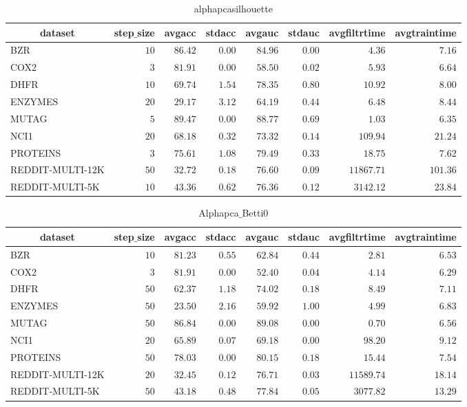 \documentclass[]{article}
\begin{document}
\begin{table}[!tbp]
\caption{alphapcasilhouette\label{alphapcasilhouette}} 
{\centering
\begin{tabular}{lrrrrrrr}
\hline\hline
\multicolumn{1}{c}{dataset}&\multicolumn{1}{c}{step$\_$size}&\multicolumn{1}{c}{avgacc}&\multicolumn{1}{c}{stdacc}&\multicolumn{1}{c}{avgauc}&\multicolumn{1}{c}{stdauc}&\multicolumn{1}{c}{avgfiltrtime}&\multicolumn{1}{c}{avgtraintime}\tabularnewline
\hline
BZR&$10$&$86.42$&$0.00$&$84.96$&$0.00$&$    4.36$&$  7.16$\tabularnewline
COX2&$ 3$&$81.91$&$0.00$&$58.50$&$0.02$&$    5.93$&$  6.64$\tabularnewline
DHFR&$10$&$69.74$&$1.54$&$78.35$&$0.80$&$   10.92$&$  8.00$\tabularnewline
ENZYMES&$20$&$29.17$&$3.12$&$64.19$&$0.44$&$    6.48$&$  8.44$\tabularnewline
MUTAG&$ 5$&$89.47$&$0.00$&$88.77$&$0.69$&$    1.03$&$  6.35$\tabularnewline
NCI1&$20$&$68.18$&$0.32$&$73.32$&$0.14$&$  109.94$&$ 21.24$\tabularnewline
PROTEINS&$ 3$&$75.61$&$1.08$&$79.49$&$0.33$&$   18.75$&$  7.62$\tabularnewline
REDDIT-MULTI-12K&$50$&$32.72$&$0.18$&$76.60$&$0.09$&$11867.71$&$101.36$\tabularnewline
REDDIT-MULTI-5K&$10$&$43.36$&$0.62$&$76.36$&$0.12$&$ 3142.12$&$ 23.84$\tabularnewline
\hline
\end{tabular}}
\end{table}
\begin{table}[!tbp]
\caption{Alphapca$\_$Betti0\label{Alphapca_Betti0}} 
{\centering
\begin{tabular}{lrrrrrrr}
\hline\hline
\multicolumn{1}{c}{dataset}&\multicolumn{1}{c}{step$\_$size}&\multicolumn{1}{c}{avgacc}&\multicolumn{1}{c}{stdacc}&\multicolumn{1}{c}{avgauc}&\multicolumn{1}{c}{stdauc}&\multicolumn{1}{c}{avgfiltrtime}&\multicolumn{1}{c}{avgtraintime}\tabularnewline
\hline
BZR&$10$&$81.23$&$0.55$&$62.84$&$0.44$&$    2.81$&$ 6.53$\tabularnewline
COX2&$ 3$&$81.91$&$0.00$&$52.40$&$0.04$&$    4.14$&$ 6.29$\tabularnewline
DHFR&$50$&$62.37$&$1.18$&$74.02$&$0.18$&$    8.49$&$ 7.11$\tabularnewline
ENZYMES&$50$&$23.50$&$2.16$&$59.92$&$1.00$&$    4.99$&$ 6.83$\tabularnewline
MUTAG&$50$&$86.84$&$0.00$&$89.08$&$0.00$&$    0.70$&$ 6.56$\tabularnewline
NCI1&$20$&$65.89$&$0.07$&$69.18$&$0.00$&$   98.20$&$ 9.12$\tabularnewline
PROTEINS&$50$&$78.03$&$0.00$&$80.15$&$0.18$&$   15.44$&$ 7.54$\tabularnewline
REDDIT-MULTI-12K&$20$&$32.45$&$0.12$&$76.71$&$0.03$&$11589.74$&$18.14$\tabularnewline
REDDIT-MULTI-5K&$50$&$43.18$&$0.48$&$77.84$&$0.05$&$ 3077.82$&$13.29$\tabularnewline
\hline
\end{tabular}}
\end{table}
\end{document}

